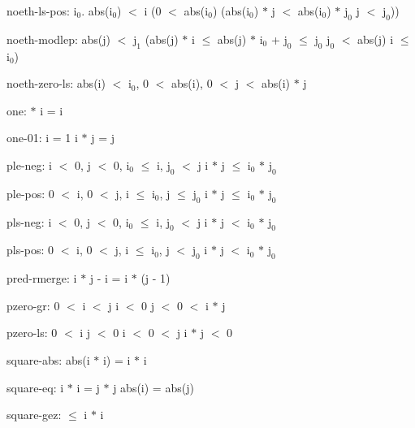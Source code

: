 \documentclass[a4paper]{article}
\begin{document}
\item	noeth-ls-pos:  \Fol \All $\mbox{i}_{0}$. abs($\mbox{i}_{0}$) $<$ i \Imp (0 $<$ abs($\mbox{i}_{0}$) \Imp (abs($\mbox{i}_{0}$) $*$ j $<$ abs($\mbox{i}_{0}$) $*$ $\mbox{j}_{0}$ \Equiv j $<$ $\mbox{j}_{0}$))

\item	noeth-modlep:  \Fol abs(j) $<$ $\mbox{j}_{1}$ \Imp (abs(j) $*$ i $\le$ abs(j) $*$ $\mbox{i}_{0}$ + $\mbox{j}_{0}$  $\le$ $\mbox{j}_{0}$ \And $\mbox{j}_{0}$ $<$ abs(j) \Imp i $\le$ $\mbox{i}_{0}$)

\item	noeth-zero-ls: abs(i) $<$ $\mbox{i}_{0}$, 0 $<$ abs(i), 0 $<$ j  $<$ abs(i) $*$ j

\item	one:   $*$ i = i

\item	one-01:  \Fol i = 1 \Imp i $*$ j = j

\item	ple-neg: i $<$ 0, j $<$ 0, $\mbox{i}_{0}$ $\le$ i, $\mbox{j}_{0}$ $<$ j \Fol i $*$ j $\le$ $\mbox{i}_{0}$ $*$ $\mbox{j}_{0}$

\item	ple-pos: 0 $<$ i, 0 $<$ j, i $\le$ $\mbox{i}_{0}$, j $\le$ $\mbox{j}_{0}$ \Fol i $*$ j $\le$ $\mbox{i}_{0}$ $*$ $\mbox{j}_{0}$

\item	pls-neg: i $<$ 0, j $<$ 0, $\mbox{i}_{0}$ $\le$ i, $\mbox{j}_{0}$ $<$ j \Fol i $*$ j $<$ $\mbox{i}_{0}$ $*$ $\mbox{j}_{0}$

\item	pls-pos: 0 $<$ i, 0 $<$ j, i $\le$ $\mbox{i}_{0}$, j $<$ $\mbox{j}_{0}$ \Fol i $*$ j $<$ $\mbox{i}_{0}$ $*$ $\mbox{j}_{0}$

\item	pred-rmerge:  \Fol i $*$ j - i = i $*$ (j - 1)

\item	pzero-gr: 0 $<$ i  $<$ j \Or i $<$ 0 \And j $<$ 0  $<$ i $*$ j

\item	pzero-ls: 0 $<$ i \And j $<$ 0 \Or i $<$ 0  $<$ j \Fol i $*$ j $<$ 0

\item	square-abs:  \Fol abs(i $*$ i) = i $*$ i

\item	square-eq:  \Fol i $*$ i = j $*$ j \Equiv abs(i) = abs(j)

\item	square-gez:   $\le$ i $*$ i
\end{document}
